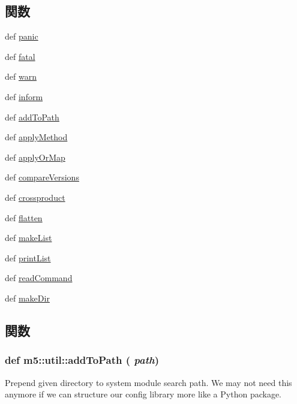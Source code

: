 \subsection*{関数}
\begin{DoxyCompactItemize}
\item 
def \hyperlink{namespacem5_1_1util_aa2cb9615f3da634982552408620a1b99}{panic}
\item 
def \hyperlink{namespacem5_1_1util_ae1c80955a028fc0aec505dbd4fa9e09c}{fatal}
\item 
def \hyperlink{namespacem5_1_1util_af8ddd678b5f4fc6b3d4d6e06291b4bb4}{warn}
\item 
def \hyperlink{namespacem5_1_1util_a93d91fcd263b81cfcf7cdbf726f106d6}{inform}
\item 
def \hyperlink{namespacem5_1_1util_a263a170421c97dbc23812718b71ee70d}{addToPath}
\item 
def \hyperlink{namespacem5_1_1util_ab1c0a698e0ba669fe3ef6c18e4c93f65}{applyMethod}
\item 
def \hyperlink{namespacem5_1_1util_a7334481c369897a3fdc6df753972f5f8}{applyOrMap}
\item 
def \hyperlink{namespacem5_1_1util_a5b6cc0ea95b0e707231a420d9bd57f07}{compareVersions}
\item 
def \hyperlink{namespacem5_1_1util_a15681e303c0d9c6c1bc489f4197e4814}{crossproduct}
\item 
def \hyperlink{namespacem5_1_1util_a3a48f3283686eb13056318134122a74a}{flatten}
\item 
def \hyperlink{namespacem5_1_1util_a21a8ae7bb1334e05e9b870de5f0675f8}{makeList}
\item 
def \hyperlink{namespacem5_1_1util_a375ec1766215b51a41c8f07219728164}{printList}
\item 
def \hyperlink{namespacem5_1_1util_a9c9d966763727d2b9e9311eae3d8f112}{readCommand}
\item 
def \hyperlink{namespacem5_1_1util_a25ec95943ee170ca910bafa9376613ff}{makeDir}
\end{DoxyCompactItemize}


\subsection{関数}
\hypertarget{namespacem5_1_1util_a263a170421c97dbc23812718b71ee70d}{
\subsubsection[{addToPath}]{\setlength{\rightskip}{0pt plus 5cm}def m5::util::addToPath ( {\em path})}}
\label{namespacem5_1_1util_a263a170421c97dbc23812718b71ee70d}
\begin{DoxyVerb}Prepend given directory to system module search path.  We may not
need this anymore if we can structure our config library more like a
Python package.\end{DoxyVerb}
 



